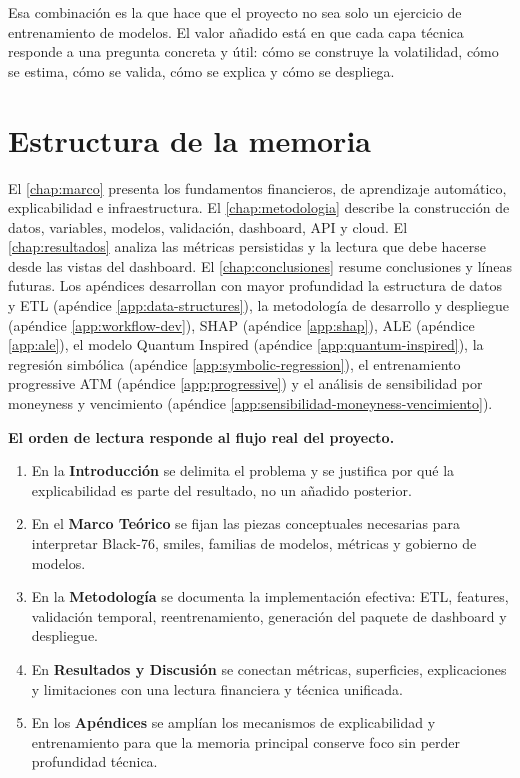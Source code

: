 Esa combinación es la que hace que el proyecto no sea solo un ejercicio de entrenamiento de modelos. El valor añadido está en que cada capa técnica responde a una pregunta concreta y útil: cómo se construye la volatilidad, cómo se estima, cómo se valida, cómo se explica y cómo se despliega.

\section{Estructura de la memoria}
\label{sec:estructura}

El \autoref{chap:marco} presenta los fundamentos financieros, de aprendizaje automático, explicabilidad e infraestructura. El \autoref{chap:metodologia} describe la construcción de datos, variables, modelos, validación, dashboard, API y cloud. El \autoref{chap:resultados} analiza las métricas persistidas y la lectura que debe hacerse desde las vistas del dashboard. El \autoref{chap:conclusiones} resume conclusiones y líneas futuras. Los apéndices desarrollan con mayor profundidad la estructura de datos y ETL (apéndice \ref{app:data-structures}), la metodología de desarrollo y despliegue (apéndice \ref{app:workflow-dev}), SHAP (apéndice \ref{app:shap}), ALE (apéndice \ref{app:ale}), el modelo Quantum Inspired (apéndice \ref{app:quantum-inspired}), la regresión simbólica (apéndice \ref{app:symbolic-regression}), el entrenamiento progressive ATM (apéndice \ref{app:progressive}) y el análisis de sensibilidad por moneyness y vencimiento (apéndice \ref{app:sensibilidad-moneyness-vencimiento}).

\textbf{El orden de lectura responde al flujo real del proyecto.}

\begin{enumerate}
  \item En la \textbf{Introducción} se delimita el problema y se justifica por qué la explicabilidad es parte del resultado, no un añadido posterior.
  \item En el \textbf{Marco Teórico} se fijan las piezas conceptuales necesarias para interpretar Black-76, smiles, familias de modelos, métricas y gobierno de modelos.
  \item En la \textbf{Metodología} se documenta la implementación efectiva: ETL, features, validación temporal, reentrenamiento, generación del paquete de dashboard y despliegue.
  \item En \textbf{Resultados y Discusión} se conectan métricas, superficies, explicaciones y limitaciones con una lectura financiera y técnica unificada.
  \item En los \textbf{Apéndices} se amplían los mecanismos de explicabilidad y entrenamiento para que la memoria principal conserve foco sin perder profundidad técnica.
\end{enumerate}


